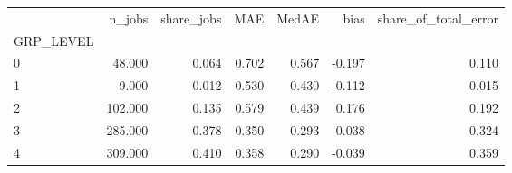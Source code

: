\begin{tabular}{lrrrrrr}
\toprule
 & n_jobs & share_jobs & MAE & MedAE & bias & share_of_total_error \\
GRP_LEVEL &  &  &  &  &  &  \\
\midrule
0 & 48.000 & 0.064 & 0.702 & 0.567 & -0.197 & 0.110 \\
1 & 9.000 & 0.012 & 0.530 & 0.430 & -0.112 & 0.015 \\
2 & 102.000 & 0.135 & 0.579 & 0.439 & 0.176 & 0.192 \\
3 & 285.000 & 0.378 & 0.350 & 0.293 & 0.038 & 0.324 \\
4 & 309.000 & 0.410 & 0.358 & 0.290 & -0.039 & 0.359 \\
\bottomrule
\end{tabular}
